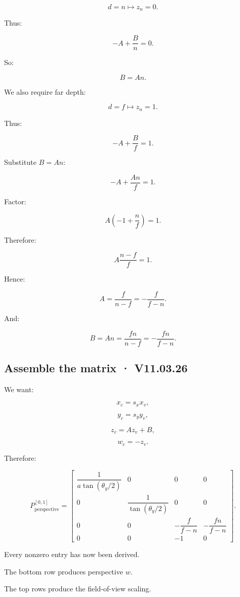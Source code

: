 \[
 d=n\longmapsto z_n=0.
\]

Thus:

\[
 -A+\frac Bn=0.
\]

So:

\[
 \boxed{B=An}.
\]

We also require far depth:

\[
 d=f\longmapsto z_n=1.
\]

Thus:

\[
 -A+\frac Bf=1.
\]

Substitute \(B=An\):

\[
 -A+\frac{An}{f}=1.
\]

Factor:

\[
 A\left(-1+\frac nf\right)=1.
\]

Therefore:

\[
 A\frac{n-f}{f}=1.
\]

Hence:

\[
 \boxed{ A=\frac f{n-f} =-\frac f{f-n} }.
\]

And:

\[
 \boxed{ B=An= \frac{fn}{n-f} =-\frac{fn}{f-n} }.
\]

\subsection{Assemble the matrix · V11.03.26}\label{02-foundations-ii-ch033-assemble-the-matrix-v11.03.26}

\hypertarget{02-foundations-ii-ch033-assemble-the-matrix-v11.03.26}{}

We want:

\[
 x_c=s_xx_v,
\]

\[
 y_c=s_yy_v,
\]

\[
 z_c=Az_v+B,
\]

\[
 w_c=-z_v.
\]

Therefore:

\[
 \boxed{ P_{\mathrm{perspective}}^{[0,1]}= \begin{bmatrix} \dfrac1{a\tan(\theta_y/2)}&0&0&0\\ 0&\dfrac1{\tan(\theta_y/2)}&0&0\\ 0&0&-\dfrac f{f-n}&-\dfrac{fn}{f-n}\\ 0&0&-1&0 \end{bmatrix} }.
\]

Every nonzero entry has now been derived.

The bottom row produces perspective \(w\).

The top rows produce the field-of-view scaling.

